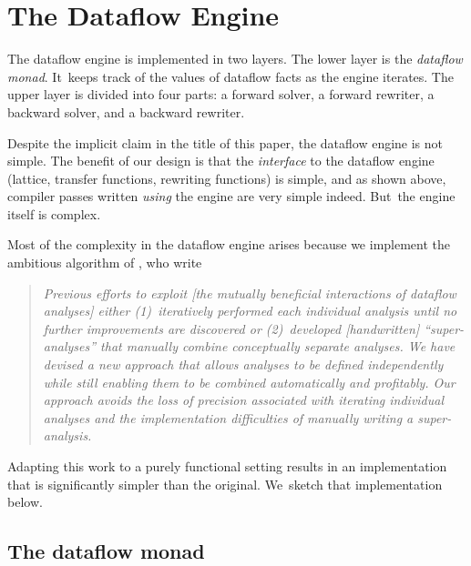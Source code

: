 \documentclass[blockstyle,preprint,nocopyrightspace]{sigplanconf}
\newcommand\seclabel[1]{\label{sec:#1}}
\begin{document}
\ifseparateengine

\else
\section{The Dataflow Engine}
\seclabel{engine}
\seclabel{dfengine}

The dataflow engine is implemented in two layers.
The lower layer is the \emph{dataflow monad}.
It~keeps track of the values of dataflow facts as the engine iterates.
The upper layer is divided into four parts:
a forward solver, a forward rewriter,
a backward solver, and a backward rewriter.

Despite the implicit claim in the title of this paper,
the dataflow engine is not simple.
The benefit of our design is that the \emph{interface} to the dataflow
engine (lattice, transfer functions, rewriting functions) is simple,
and as shown above, compiler passes written \emph{using} the engine
are very simple indeed.
But~the engine itself is complex.

Most of the complexity in the dataflow engine arises because we
implement the ambitious algorithm of
\citet{lerner-grove-chambers:2002}, who write
\begin{quote}
\emph{Previous efforts to exploit [the mutually beneficial
interactions of dataflow analyses] either (1)~iteratively performed
each individual analysis until no further improvements are discovered
or (2)~developed [handwritten] ``super-analyses'' that manually
combine conceptually separate analyses. We have devised a new approach
that allows analyses to be defined independently while still enabling
them to be combined automatically and profitably. Our approach avoids
the loss of precision associated with iterating individual analyses
and the implementation difficulties of manually writing a
super-analysis.}
\end{quote}
Adapting this work to a purely functional setting results in an
implementation that is significantly simpler than the original.
We~sketch that implementation below.





\subsection{The dataflow monad}
\end{document}
